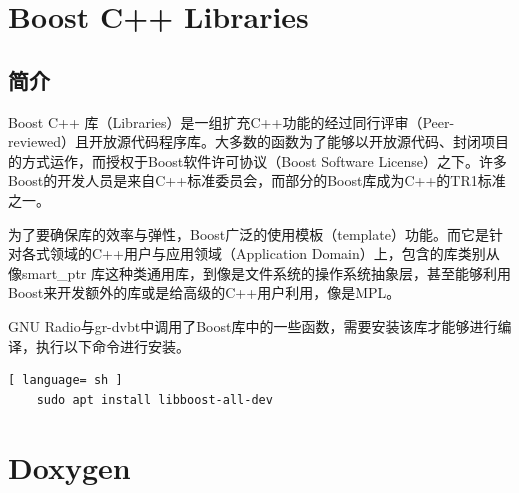 	\section{Boost C++ Libraries}
		\subsection{简介}
			\par Boost C++ 库（Libraries）是一组扩充C++功能的经过同行评审（Peer-reviewed）且开放源代码程序库。大多数的函数为了能够以开放源代码、封闭项目的方式运作，而授权于Boost软件许可协议（Boost Software License）之下。许多Boost的开发人员是来自C++标准委员会，而部分的Boost库成为C++的TR1标准之一。
			\par 为了要确保库的效率与弹性，Boost广泛的使用模板（template）功能。而它是针对各式领域的C++用户与应用领域（Application Domain）上，包含的库类别从像smart\_ptr 库这种类通用库，到像是文件系统的操作系统抽象层，甚至能够利用Boost来开发额外的库或是给高级的C++用户利用，像是MPL。\cite{ wiki:Boost}
			\par GNU Radio与gr-dvbt中调用了Boost库中的一些函数，需要安装该库才能够进行编译，执行以下命令进行安装。
			\begin{lstlisting}[ language= sh ]
	sudo apt install libboost-all-dev
			\end{lstlisting}
	\section{Doxygen}
